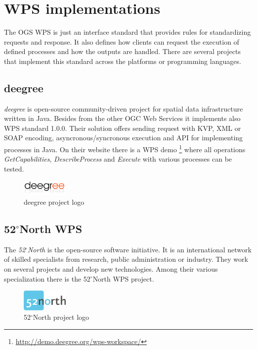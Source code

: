 \documentclass[12pt,a4paper]{article}
\begin{document}
\newpage
\section{WPS implementations}
The OGS WPS is just an interface standard that provides rules for standardizing requests and response. It also defines how clients can request the execution of defined processes and how the outputs are handled. There are several projects that implement this standard across the platforms or programming languages.

\subsection{deegree}
\textit{deegree} is open-source community-driven project for spatial data infrastructure written in Java. Besides from the other OGC Web Services it implements also WPS standard 1.0.0. Their solution offers sending request with KVP, XML or SOAP encoding, asyncronous/syncronous execution and API for implementing processes in Java. On their website there is a WPS demo
\footnote{\url{http://demo.deegree.org/wps-workspace/}} where all operations \textit{GetCapabilities}, \textit{DescribeProcess} and \textit{Execute} with various processes can be tested.

\bigskip
\begin{figure}[h!]
\centering
\includegraphics[width=0.2\textwidth]{img/deegree.png}
\caption{deegree project logo}
\label{fig:deegree}
\end{figure}

\subsection{52$^{\circ}$North WPS}
The \textit{52$^{\circ}$North} is the open-source software initiative. It is an international network of skilled specialists from research,
public administration or industry. They work on several projects and develop new technologies. Among their various specialization there is 
the 52$^{\circ}$North WPS project.

\bigskip
\begin{figure}[h!]
\centering
\includegraphics[width=0.2\textwidth]{img/Intro_52north.png}
\caption{52$^{\circ}$North project logo}
\label{fig:Intro_52north}
\end{figure}
\end{document}
